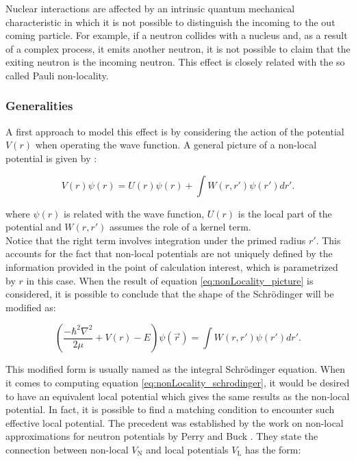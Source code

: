 \documentclass[openany]{book}
\begin{document}
Nuclear interactions are affected by an intrinsic quantum mechanical characteristic in which it is not possible to distinguish the incoming to the out coming particle. For example, if a neutron collides with a nucleus and, as a result of a complex process, it emits another neutron, it is not possible to claim that the exiting neutron is the incoming neutron.  This effect is closely related with the so called Pauli non-locality. \\

\subsubsection{Generalities}

A first approach to model this effect is by considering the action of the potential $V(r)$ when operating the wave function. A general picture of a non-local potential is given by \cite{descouvemont_baye_2010}:

\begin{equation} \label{eq:nonLocality_picture}
	V(r) \psi(r) = U(r) \psi(r) + \int W(r, r') \psi(r') dr'.
\end{equation}

where $\psi(r)$ is related with the wave function, $U(r)$ is the local part of the potential and $W(r, r')$ assumes the role of a kernel term. \\

Notice that the right term involves integration under the primed radius $r'$. This accounts for the fact that non-local potentials are not uniquely defined by the information provided in the point of calculation interest, which is parametrized by $r$ in this case. When the result of equation \ref{eq:nonLocality_picture} is considered, it is possible to conclude that the shape of the Schrödinger will be modified as:

\begin{equation} \label{eq:nonLocality_schrodinger}
	\left(\frac{-\hbar^2 \nabla^2}{2\mu} + V(r)  - E  \right) \psi(\vec r) =   \int W(r, r') \psi(r') dr'.
\end{equation}

This modified form is usually named as the integral Schrödinger equation. When it comes to computing equation \ref{eq:nonLocality_schrodinger}, it would be desired to have an equivalent local potential which gives the same results as the non-local potential. In fact, it is possible to find a matching condition to encounter such effective local potential. The precedent was established by the work on non-local approximations for neutron potentials by Perry and Buck \cite{perey_buck_1962}. They state the connection between non-local $V_{\mathrm{N}}$ and local potentials $V_{\mathrm{L}}$ has the form:
\end{document}
